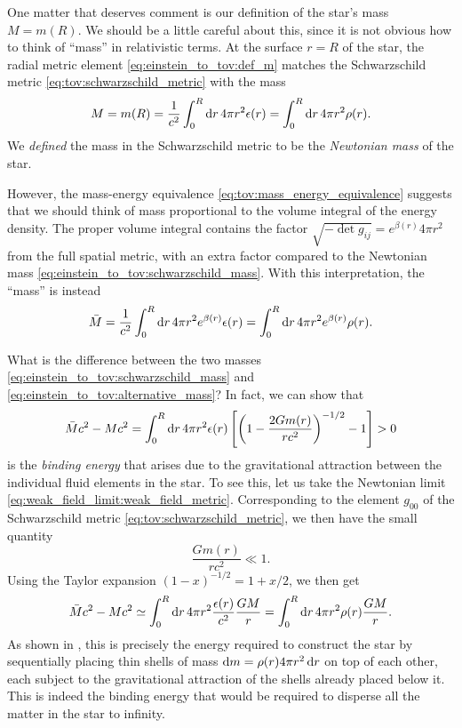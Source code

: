 One matter that deserves comment is our definition of the star's mass $M = m(R)$.
We should be a little careful about this, since it is not obvious how to think of ``mass'' in relativistic terms.
At the surface $r=R$ of the star, the radial metric element \eqref{eq:einstein_to_tov:def_m} matches the Schwarzschild metric \eqref{eq:tov:schwarzschild_metric} with the mass
\begin{equation}
	M = m(R) = \frac{1}{c^2} \integral{4 \pi r^2 \epsilon(r)}{r}{0}{R} = \integral{4 \pi r^2 \rho(r)}{r}{0}{R} .
	\label{eq:einstein_to_tov:schwarzschild_mass}
\end{equation}
We \emph{defined} the mass in the Schwarzschild metric to be the \emph{Newtonian mass} of the star.

However, the mass-energy equivalence \eqref{eq:tov:mass_energy_equivalence} suggests that we should think of mass proportional to the volume integral of the energy density.
The proper volume integral contains the factor $\sqrt{-\det{g_{ij}}} = e^{\beta(r)} 4 \pi r^2$ from the full spatial metric, with an extra factor compared to the Newtonian mass \eqref{eq:einstein_to_tov:schwarzschild_mass}.
With this interpretation, the ``mass'' is instead
\begin{equation}
	\bar{M} = \frac{1}{c^2} \integral{4 \pi r^2 e^{\beta(r)} \epsilon(r)}{r}{0}{R}
	        = \integral{4 \pi r^2 e^{\beta(r)} \rho(r)}{r}{0}{R} .
\label{eq:einstein_to_tov:alternative_mass}
\end{equation}

What is the difference between the two masses \eqref{eq:einstein_to_tov:schwarzschild_mass} and \eqref{eq:einstein_to_tov:alternative_mass}?
In fact, we can show that
\begin{equation}
	\bar{M} c^2 - M c^2 = \integral{4 \pi r^2 \epsilon(r) \left[ \left( 1-\frac{2Gm(r)}{rc^2} \right)^{-1/2} - 1 \right]}{r}{0}{R} > 0
\end{equation}
is the \emph{binding energy} that arises due to the gravitational attraction between the individual fluid elements in the star.
To see this, let us take the Newtonian limit \eqref{eq:weak_field_limit:weak_field_metric}.
Corresponding to the element $g_{00}$ of the Schwarzschild metric \eqref{eq:tov:schwarzschild_metric}, we then have the small quantity
\begin{equation}
	\frac{G m(r)}{rc^2} \ll 1 .
	\label{eq:weak_field_limit:small_gmr}
\end{equation}
Using the Taylor expansion $(1 - x)^{-1/2} = 1 + x/2$, we then get
\begin{equation}
	\bar{M} c^2 - M c^2 \taylor \integral{4 \pi r^2 \frac{\epsilon(r)}{c^2} \frac{GM}{r}}{r}{0}{R}
	                    =       \integral{4 \pi r^2 \rho(r) \frac{GM}{r}}{r}{0}{R} .
\end{equation}
As shown in \cite[exercise 23.7]{ref:mtw}, this is precisely the energy required to construct the star by sequentially placing thin shells of mass $\dif m = \rho(r) 4 \pi r^2 \dif r$ on top of each other, each subject to the gravitational attraction of the shells already placed below it.
This is indeed the binding energy that would be required to disperse all the matter in the star to infinity.

